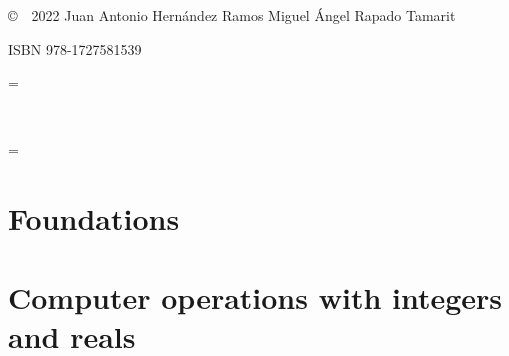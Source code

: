 \documentclass[a4paper,10pt,twoside,english]{book}
\begin{document}
       \noindent \copyright  \ \ 2022 Juan Antonio Hernández Ramos 
       \hspace{0.7cm}     Miguel Ángel Rapado Tamarit
    
    \vspace{0.5cm}            
    \noindent ISBN 978-1727581539 
    \clearpage
    
  
    \frontmatter
    
    
    \parskip = \baselineskip %
    
    \newpage
    \setlength{\parskip}{0pt}
    \tableofcontents
    ~\clearpage


    
    \parskip = \baselineskip
    
    \mainmatter
  
    \newcommand\home{./Fortran_project/sources/IEEE}
  
   
    
  \part{Foundations}\label{PartI}
         
         
         
         
         
          
         
   
 
  \part{Computer operations with integers and reals}\label{PartII} 
       
       
       
       
\end{document}
